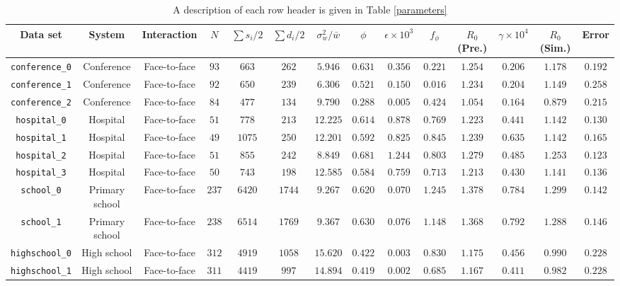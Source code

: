 \documentclass[10pt]{article}
\begin{document}
\begin{landscape}

\begin{table}[t]
\footnotesize
\caption{A description of each row header is given in Table \ref{parameters}}
\label{results_table}
\centering
\begin{tabular}{c|ccccccccccccc}
\toprule
Data set & System & Interaction & $N$ & $\sum s_{i}/2$ & $\sum d_{i}/2$ & $\sigma_{w}^{2}/\bar{w}$ & $\phi$ & $\epsilon \times 10^{3}$ & $f_{\phi}$ & $R_{0}$ (Pre.) & $\gamma \times 10^{4}$ & $R_{0}$ (Sim.) & Error \\ 
\midrule 
\verb|conference_0| & Conference & Face-to-face & $93$ & $663$ & $262$ & $5.946$ & $0.631$ & $0.356$ & $0.221$ & $1.254$ & $0.206$ & $1.178$ & $0.192$\\
\verb|conference_1| & Conference & Face-to-face & $92$ & $650$ & $239$ & $6.306$ & $0.521$ & $0.150$ & $0.016$ & $1.234$ & $0.204$ & $1.149$ & $0.258$\\
\verb|conference_2| & Conference & Face-to-face & $84$ & $477$ & $134$ & $9.790$ & $0.288$ & $0.005$ & $0.424$ & $1.054$ & $0.164$ & $0.879$ & $0.215$\\
\verb|hospital_0| & Hospital & Face-to-face & $51$ & $778$ & $213$ & $12.225$ & $0.614$ & $0.878$ & $0.769$ & $1.223$ & $0.441$ & $1.142$ & $0.130$\\
\verb|hospital_1| & Hospital & Face-to-face & $49$ & $1075$ & $250$ & $12.201$ & $0.592$ & $0.825$ & $0.845$ & $1.239$ & $0.635$ & $1.142$ & $0.165$\\
\verb|hospital_2| & Hospital & Face-to-face & $51$ & $855$ & $242$ & $8.849$ & $0.681$ & $1.244$ & $0.803$ & $1.279$ & $0.485$ & $1.253$ & $0.123$\\
\verb|hospital_3| & Hospital & Face-to-face & $50$ & $743$ & $198$ & $12.585$ & $0.584$ & $0.759$ & $0.713$ & $1.213$ & $0.430$ & $1.141$ & $0.136$\\
\verb|school_0| & Primary school & Face-to-face & $237$ & $6420$ & $1744$ & $9.267$ & $0.620$ & $0.070$ & $1.245$ & $1.378$ & $0.784$ & $1.299$ & $0.142$\\
\verb|school_1| & Primary school & Face-to-face & $238$ & $6514$ & $1769$ & $9.367$ & $0.630$ & $0.076$ & $1.148$ & $1.368$ & $0.792$ & $1.288$ & $0.146$\\
\verb|highschool_0| & High school & Face-to-face & $312$ & $4919$ & $1058$ & $15.620$ & $0.422$ & $0.003$ & $0.830$ & $1.175$ & $0.456$ & $0.990$ & $0.228$\\
\verb|highschool_1| & High school & Face-to-face & $311$ & $4419$ & $997$ & $14.894$ & $0.419$ & $0.002$ & $0.685$ & $1.167$ & $0.411$ & $0.982$ & $0.228$\\

\end{tabular}
\end{table}
\end{landscape}
\end{document}
